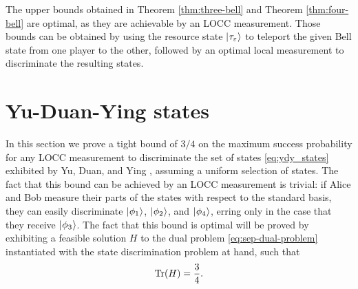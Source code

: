 \begin{remark}
  The upper bounds obtained in Theorem \ref{thm:three-bell} and Theorem \ref{thm:four-bell} are optimal, 
  as they are achievable by an LOCC measurement.
  Those bounds can be obtained by using the resource
  state $\lvert\mspace{0.5mu} \tau_\varepsilon \mspace{0.5mu} \rangle$ to teleport the given Bell state from one
  player to the other, followed by an optimal local measurement to discriminate
  the resulting states.
\end{remark}

\section{Yu-Duan-Ying states}

In this section we prove a tight bound of $3/4$ on the maximum success
probability for any LOCC measurement to discriminate the set of states 
\eqref{eq:ydy_states} exhibited by Yu, Duan, and Ying \cite{Yu12},
assuming a uniform selection of states.
The fact that this bound can be achieved by an LOCC measurement is trivial:
if Alice and Bob measure their parts of the states with respect to the standard
basis, they can easily discriminate $\lvert\mspace{0.5mu} \phi_1 \mspace{0.5mu} \rangle$, $\lvert\mspace{0.5mu} \phi_2 \mspace{0.5mu} \rangle$, and 
$\lvert\mspace{0.5mu} \phi_4 \mspace{0.5mu} \rangle$, erring only in the case that they receive $\lvert\mspace{0.5mu} \phi_3 \mspace{0.5mu} \rangle$.
The fact that this bound is optimal will be proved by exhibiting a 
feasible solution $H$ to the dual problem \eqref{eq:sep-dual-problem}
instantiated with the state discrimination problem at hand, such that
\begin{equation}
\operatorname{Tr}(H) = \frac{3}{4}.
\end{equation}

